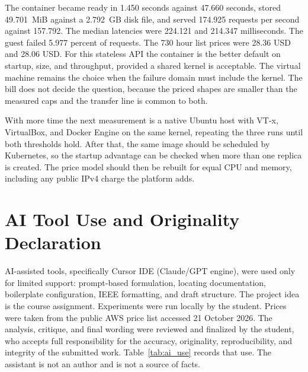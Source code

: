 \documentclass[conference,a4paper]{IEEEtran}
\begin{document}
The container became ready in 1.450 seconds against 47.660 seconds, stored 49.701~MiB against a 2.792~GB disk file, and served 174.925 requests per second against 157.792. The median latencies were 224.121 and 214.347 milliseconds. The guest failed 5.977 percent of requests. The 730 hour list prices were 28.36 USD and 28.06 USD. For this stateless API the container is the better default on startup, size, and throughput, provided a shared kernel is acceptable. The virtual machine remains the choice when the failure domain must include the kernel. The bill does not decide the question, because the priced shapes are smaller than the measured caps and the transfer line is common to both.

With more time the next measurement is a native Ubuntu host with VT-x, VirtualBox, and Docker Engine on the same kernel, repeating the three runs until both thresholds hold. After that, the same image should be scheduled by Kubernetes, so the startup advantage can be checked when more than one replica is created. The price model should then be rebuilt for equal CPU and memory, including any public IPv4 charge the platform adds.

\section*{AI Tool Use and Originality Declaration}
\label{sec:ai_declaration}

AI-assisted tools, specifically Cursor IDE (Claude/GPT engine), were used only for limited support: prompt-based formulation, locating documentation, boilerplate configuration, IEEE formatting, and draft structure. The project idea is the course assignment. Experiments were run locally by the student. Prices were taken from the public AWS price list accessed 21 October 2026. The analysis, critique, and final wording were reviewed and finalized by the student, who accepts full responsibility for the accuracy, originality, reproducibility, and integrity of the submitted work. Table~\ref{tab:ai_use} records that use. The assistant is not an author and is not a source of facts.
\end{document}
